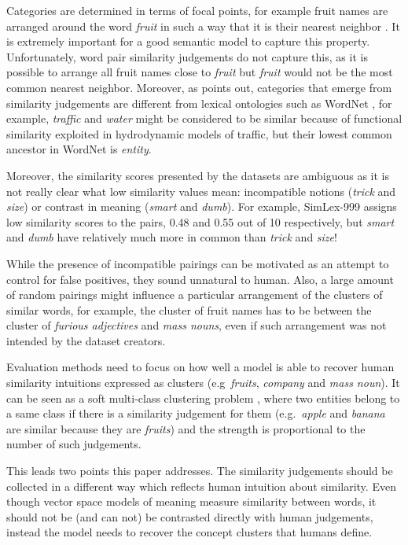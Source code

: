 \documentclass[11pt]{article}
\begin{document}
Categories are determined in terms of focal points, for example fruit names are arranged around the word \textit{fruit} in such a way that it is their nearest neighbor \cite{1986-13502-00119860101}. It is extremely important for a good semantic model to capture this property. Unfortunately, word pair similarity judgements do not capture this, as it is possible to arrange all fruit names close to \textit{fruit} but \textit{fruit} would not be the most common nearest neighbor. Moreover, as  points out, categories that emerge from similarity judgements are different from lexical ontologies such as WordNet \cite{Miller:1995:WLD:219717.219748}, for example, \textit{traffic} and \textit{water} might be considered to be similar because of functional similarity exploited in hydrodynamic models of traffic, but their lowest common ancestor in WordNet is \textit{entity}.

Moreover, the similarity scores presented by the datasets are ambiguous as it is not really clear what low similarity values mean: incompatible notions (\textit{trick} and \textit{size}) or contrast in meaning (\textit{smart} and \textit{dumb}). For example, SimLex-999 assigns low similarity scores to the pairs, 0.48 and 0.55 out of 10 respectively, but \textit{smart} and \textit{dumb} have relatively much more in common than \textit{trick} and \textit{size}!

While the presence of incompatible pairings can be motivated as an attempt to control for false positives, they sound unnatural to human. Also, a large amount of random pairings\footnotemark{} might influence a particular arrangement of the clusters of similar words, for example, the cluster of fruit names has to be between the cluster of \textit{furious adjectives} and \textit{mass nouns}, even if such arrangement was not intended by the dataset creators.

Evaluation methods need to focus on how well a model is able to recover human similarity intuitions expressed as clusters (e.g~\textit{fruits}, \textit{company} and \textit{mass noun}). It can be seen as a soft multi-class clustering problem \cite{White:2015:WSE:2838931.2838932}, where two entities belong to a same class if there is a similarity judgement for them (e.g.~\textit{apple} and \textit{banana} are similar because they are \textit{fruits}) and the strength is proportional to the number of such judgements.

This leads two points this paper addresses. The similarity judgements should be collected in a different way which reflects human intuition about similarity. Even though vector space models of meaning measure similarity between words, it should not be (and can not) be contrasted directly with human judgements, instead the model needs to recover the concept clusters that humans define.

% 


\balance
\end{document}
